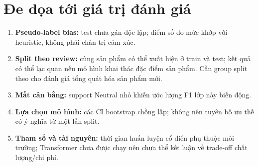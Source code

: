 \section{Đe dọa tới giá trị đánh giá}
\begin{enumerate}
  \item \textbf{Pseudo-label bias:} test chưa gán độc lập; điểm số đo mức khớp với heuristic, không phải chân trị cảm xúc.
  \item \textbf{Split theo review:} cùng sản phẩm có thể xuất hiện ở train và test; kết quả có thể lạc quan nếu mô hình khai thác đặc điểm sản phẩm. Cần group split theo  cho đánh giá tổng quát hóa sản phẩm mới.
  \item \textbf{Mất cân bằng:} support Neutral nhỏ khiến ước lượng F1 lớp này biến động.
  \item \textbf{Lựa chọn mô hình:} các CI bootstrap chồng lấp; không nên tuyên bố ưu thế có ý nghĩa từ một lần split.
  \item \textbf{Tham số và tài nguyên:} thời gian huấn luyện cổ điển phụ thuộc môi trường; Transformer chưa được chạy nên chưa thể kết luận về trade-off chất lượng/chi phí.
\end{enumerate}
